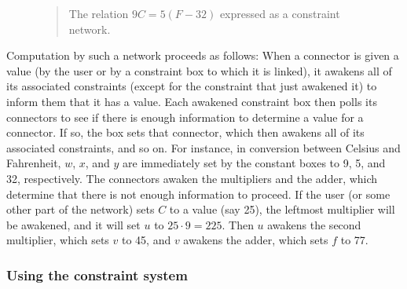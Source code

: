\begin{figure}[tb]
\label{Figure 3.28}
\centering
\begin{comment}
\begin{quote}
\heading{Figure 3.28:} The relation \( 9C = 5(F - 32) \) expressed as a constraint network.

\begin{example}
       +---------+     +---------+   v   +---------+
C -----+ m1      |  u  |      m1 +-------+ a1      |
       |    *  p +-----+ p  *    |       |    *  s +---- F
    +--+ m2      |     |      m2 +--+ +--+ a2      |
    |  +---------+     +---------+  | |  +---------+
  w |                              x| |y
    |    +-----+        +-----+     | |     +-----+
    +----+  9  |        |  5  +-----+ +-----+  32 |
         +-----+        +-----+             +-----+
\end{example}
\end{quote}
\end{comment}

\begin{quote}
 The relation \( 9C = 5(F - 32) \) expressed as a constraint network.
\end{quote}
\end{figure}

Computation by such a network proceeds as follows: When a connector is given a
value (by the user or by a constraint box to which it is linked), it awakens
all of its associated constraints (except for the constraint that just awakened
it) to inform them that it has a value.  Each awakened constraint box then
polls its connectors to see if there is enough information to determine a value
for a connector.  If so, the box sets that connector, which then awakens all of
its associated constraints, and so on.  For instance, in conversion between
Celsius and Fahrenheit, \( w \), \( x \), and \( y \) are immediately set by the
constant boxes to 9, 5, and 32, respectively.  The connectors awaken the
multipliers and the adder, which determine that there is not enough information
to proceed.  If the user (or some other part of the network) sets \( C \) to a
value (say 25), the leftmost multiplier will be awakened, and it will set \( u \)
to \( 25 \cdot 9 = 225 \).  Then \( u \) awakens the second multiplier, which sets \( v \) to
45, and \( v \) awakens the adder, which sets \( f \) to 77.

\subsubsection*{Using the constraint system}

